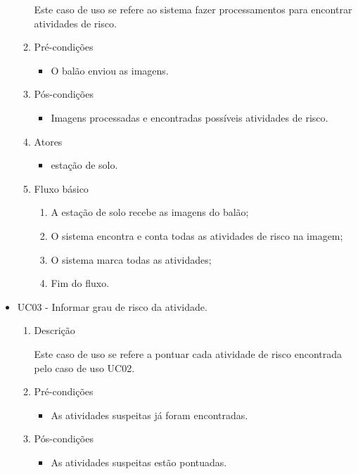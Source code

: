 \begin{itemize}
\begin{enumerate}
					Este caso de uso se refere ao sistema fazer processamentos para encontrar atividades de risco.

				\item Pré-condições
					\begin{itemize}
						\item O balão enviou as imagens.
					\end{itemize}

				\item Pós-condições
					\begin{itemize}
						\item Imagens processadas e encontradas possíveis atividades de risco.
					\end{itemize}

				\item Atores
					\begin{itemize}
						\item estação de solo.
					\end{itemize}


				\item Fluxo básico
					\begin{enumerate}
						\item A estação de solo recebe as imagens do balão;
						\item O sistema encontra e conta todas as atividades de risco na imagem;
						\item O sistema marca todas as atividades;
						\item Fim do fluxo.

					\end{enumerate}
			\end{enumerate}

			\item UC03 - Informar grau de risco da atividade.
				\begin{enumerate}
					\item Descrição

						Este caso de uso se refere a pontuar cada atividade de risco encontrada pelo caso de uso UC02.

					\item Pré-condições
						\begin{itemize}
							\item As atividades suspeitas já foram encontradas.
						\end{itemize}

					\item Pós-condições
						\begin{itemize}
							\item As atividades suspeitas estão pontuadas.
						\end{itemize}


\end{enumerate}
\end{itemize}
